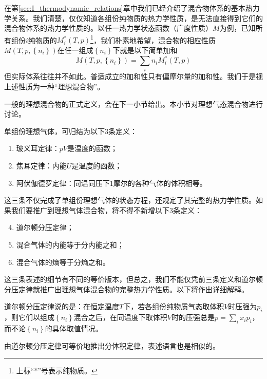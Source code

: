 \documentclass[main.tex]{subfiles}
\begin{document}
在第\ref{sec:I_thermodynamic_relations}章中我们已经介绍了混合物体系的基本热力学关系。我们清楚，仅仅知道各组份纯物质的热力学性质，是无法直接得到它们的混合物体系的热力学性质的。以任一热力学状态函数（广度性质）$M$为例，已知所有组份$i$纯物质的$M_i^*\left(T,p\right)$\footnote{上标“*”号表示纯物质。}，我们朴素地希望，混合物的相应性质$M\left(T,p,\left\{n_i\right\}\right)$在任一组成$\left\{n_i\right\}$下就是以下简单加和
\[M\left(T,p,\left\{n_i\right\}\right)=\sum_i n_i M_i^*\left(T,p\right)\]
但实际体系往往并不如此。普适成立的加和性只有偏摩尔量的加和性。我们于是视上述性质为一种“理想混合物”。

一般的理想混合物的正式定义，会在下一小节给出。本小节对理想气态混合物进行讨论。

单组份理想气体，可归结为以下3条定义：
\begin{enumerate}
    \item 玻义耳定律：$pV$是温度的函数；
    \item 焦耳定律：内能$U$是温度的函数；
    \item 阿伏伽德罗定律：同温同压下1摩尔的各种气体的体积相等。
\end{enumerate}
这三条不仅完成了单组份理想气体的状态方程，还规定了其完整的热力学性质。如果我们要推广到理想气体混合物，将不得不新增以下3条定义：
\begin{enumerate}\setcounter{enumi}{3}
    \item 道尔顿分压定律；
    \item 混合气体的内能等于分内能之和；
    \item 混合气体的熵等于分熵之和。
\end{enumerate}

这三条表述的细节有不同的等价版本，但总之，我们不能仅凭前三条定义和道尔顿分压定律就推广出理想气体混合物的完整热力学性质。以下将作出详细解释。

道尔顿分压定律说的是：在恒定温度$T$下，若各组份纯物质气态取体积$V$时压强为$p_i$，则它们以组成$\left\{n_i\right\}$混合之后，在同温度下取体积$V$时的压强总是$p=\sum_i x_ip_i$，而不论$\left\{n_i\right\}$的具体取值情况。

由道尔顿分压定律可等价地推出分体积定律，表述语言也是相似的。
\end{document}
